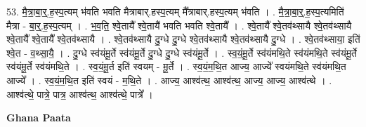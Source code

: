 \documentclass[17pt]{extarticle}
\begin{document}
53. मै॒त्रा॒बा॒र्॒.ह॒स्प॒त्यम् भ॑वति भवति मैत्राबार्.हस्प॒त्यम् मै᳚त्राबार्.हस्प॒त्यम् भ॑वति । . मै॒त्रा॒बा॒र्॒.ह॒स्प॒त्यमिति॑ मैत्रा - बा॒र्॒.ह॒स्प॒त्यम् । . भ॒व॒ति॒ श्वे॒तायै᳚ श्वे॒तायै॑ भवति भवति श्वे॒तायै᳚ । . श्वे॒तायै᳚ श्वे॒तव॑थ्सायै श्वे॒तव॑थ्सायै श्वे॒तायै᳚ श्वे॒तायै᳚ श्वे॒तव॑थ्सायै । . श्वे॒तव॑थ्सायै दु॒ग्धे दु॒ग्धे श्वे॒तव॑थ्सायै श्वे॒तव॑थ्सायै दु॒ग्धे । . श्वे॒तव॑थ्साया॒ इति॑ श्वे॒त - व॒थ्सा॒यै॒ । . दु॒ग्धे स्व॑यंमू॒र्ते स्व॑यंमू॒र्ते दु॒ग्धे दु॒ग्धे स्व॑यंमू॒र्ते । . स्व॒यं॒मू॒र्ते स्व॑यंमथि॒ते स्व॑यंमथि॒ते स्व॑यंमू॒र्ते स्व॑यंमू॒र्ते स्व॑यंमथि॒ते । . स्व॒यं॒मू॒र्त इति॑ स्वयम् - मू॒र्ते । . स्व॒यं॒म॒थि॒त आज्य॒ आज्ये᳚ स्वयंमथि॒ते स्व॑यंमथि॒त आज्ये᳚ । . स्व॒यं॒म॒थि॒त इति॑ स्वयं - म॒थि॒ते । . आज्य॒ आश्व॑त्थ॒ आश्व॑त्थ॒ आज्य॒ आज्य॒ आश्व॑त्थे । . आश्व॑त्थे॒ पात्रे॒ पात्र॒ आश्व॑त्थ॒ आश्व॑त्थे॒ पात्रे᳚ । \newline

\textbf{Ghana Paata } \newline
\end{document}
